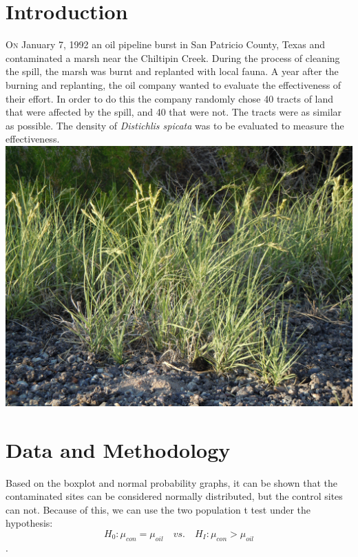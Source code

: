\documentclass[twoside]{article}
\begin{document}
\begin{multicols}{2} %

\section{Introduction}

\lettrine[nindent=0em,lines=3]{O}n January 7, 1992 an oil pipeline burst in San Patricio County, Texas and contaminated a marsh near the Chiltipin Creek.  During the process of cleaning the spill, the marsh was burnt and replanted with local fauna.  A year after the burning and replanting, the oil company wanted to evaluate the effectiveness of their effort.  In order to do this the company randomly chose 40 tracts of land that were affected by the spill, and 40 that were not.  The tracts were as similar as possible.  The density of \textit{Distichlis spicata} was to be evaluated to measure the effectiveness.
\includegraphics[scale=0.05]{Distichlis_spicata}


\section{Data and Methodology}
Based on the boxplot and normal probability graphs, it can be shown that the contaminated sites can be considered normally distributed, but the control sites can not.  Because of this, we can use the two population t test under the hypothesis: $$H_0: \mu_{con} = \mu_{oil}\quad vs. \quad H_I: \mu_{con}>\mu_{oil}$$.



\end{multicols}
\end{document}
